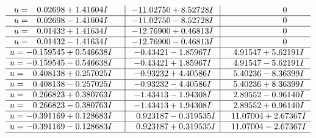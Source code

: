 \documentclass[1p]{elsarticle_modified}
\theoremstyle{definition}
\begin{document}
$$\begin{array}{c|c|c}
\begin{aligned}
u &= \phantom{-}0.02698 + 1.41604 I\end{aligned}
 & -11.02750 + 8.52728 I & \phantom{-0.000000 } 0 \\ \hline\begin{aligned}
u &= \phantom{-}0.02698 - 1.41604 I\end{aligned}
 & -11.02750 - 8.52728 I & \phantom{-0.000000 } 0 \\ \hline\begin{aligned}
u &= \phantom{-}0.01432 + 1.41634 I\end{aligned}
 & -12.76900 + 0.46813 I & \phantom{-0.000000 } 0 \\ \hline\begin{aligned}
u &= \phantom{-}0.01432 - 1.41634 I\end{aligned}
 & -12.76900 - 0.46813 I & \phantom{-0.000000 } 0 \\ \hline\begin{aligned}
u &= -0.159545 + 0.546638 I\end{aligned}
 & -0.43421 - 1.85967 I & \phantom{-}4.91547 + 5.62191 I \\ \hline\begin{aligned}
u &= -0.159545 - 0.546638 I\end{aligned}
 & -0.43421 + 1.85967 I & \phantom{-}4.91547 - 5.62191 I \\ \hline\begin{aligned}
u &= \phantom{-}0.408138 + 0.257025 I\end{aligned}
 & -0.93232 + 4.40586 I & \phantom{-}5.40236 - 8.36399 I \\ \hline\begin{aligned}
u &= \phantom{-}0.408138 - 0.257025 I\end{aligned}
 & -0.93232 - 4.40586 I & \phantom{-}5.40236 + 8.36399 I \\ \hline\begin{aligned}
u &= \phantom{-}0.266823 + 0.380763 I\end{aligned}
 & -1.43413 - 1.94308 I & \phantom{-}2.89552 - 0.96140 I \\ \hline\begin{aligned}
u &= \phantom{-}0.266823 - 0.380763 I\end{aligned}
 & -1.43413 + 1.94308 I & \phantom{-}2.89552 + 0.96140 I \\ \hline\begin{aligned}
u &= -0.391169 + 0.128683 I\end{aligned}
 & \phantom{-}0.923187 - 0.319535 I & \phantom{-}11.07004 + 2.67367 I \\ \hline\begin{aligned}
u &= -0.391169 - 0.128683 I\end{aligned}
 & \phantom{-}0.923187 + 0.319535 I & \phantom{-}11.07004 - 2.67367 I\\
 \hline 
 \end{array}$$\newpage
\end{document}
